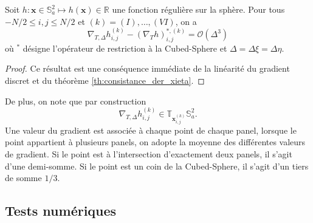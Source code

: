 \begin{proposition}
Soit $h : \mathbf{x} \in \mathbb{S}_a^2 \mapsto h(\mathbf{x}) \in \mathbb{R}$ une fonction régulière sur la sphère. Pour tous $-N/2 \leq i,j \leq N/2$ et $(k)=(I), \ldots , (VI)$, on a
\begin{equation}
\nabla_{T,\Delta} h_{i,j}^{(k)} - (\nabla_T h)^{*,(k)}_{i,j} = \mathcal{O} \left( \Delta^3 \right)
\end{equation}
où $^*$ désigne l'opérateur de restriction à la Cubed-Sphere et $\Delta = \Delta \xi = \Delta \eta$. 
\label{prop:accuracy_gradient}
\end{proposition}

\begin{proof}
Ce résultat est une conséquence immédiate de la linéarité du gradient discret et du théorème \ref{th:consistance_der_xieta}.
\end{proof}
De plus, on note que par construction
\begin{equation}
\nabla_{T,\Delta} h_{i,j}^{(k)} \in \mathbb{T}_{\mathbf{x}_{i,j}^{(k)}} \mathbb{S}_a^2.
\end{equation}
Une valeur du gradient est associée à chaque point de chaque panel, lorsque le point appartient à plusieurs panels, on adopte la moyenne des différentes valeurs de gradient. Si le point est à l'intersection d'exactement deux panels, il s'agit d'une demi-somme. Si le point est un coin de la Cubed-Sphere, il s'agit d'un tiers de somme $1/3$.

\subsection{Tests numériques}

